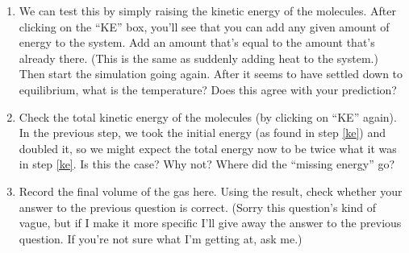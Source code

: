 \documentclass{article}
\begin{document}
\begin{enumerate}
\vskip 1.5in



\item We can test this by simply raising the kinetic energy of the 
molecules.  After clicking on the ``KE'' box, you'll see that you can
add any given amount of energy to the system.  Add an amount that's
equal to the amount that's already there.  (This is the
same as suddenly adding heat to the system.) Then start the simulation going
again.  After it seems to have settled down to equilibrium, what is the
temperature?  Does this agree with your prediction?



\vskip 1.5in



\item Check the total kinetic energy of the molecules (by clicking on ``KE''
again).  In the previous step, we took the initial energy (as found
in step \ref{ke}) and doubled it, so we might expect the total energy
now to be twice what it was in step \ref{ke}.  Is this the case?  Why not?
Where did the ``missing energy'' go?

\vskip 1in

\item Record the final volume of the gas here.  Using the result, check
whether your answer to the previous question is correct.  (Sorry
this question's kind of vague, but if I make it more specific I'll
give away the answer to the previous question.  If you're not sure
what I'm getting at, ask me.)


\end{enumerate}
\end{document}
